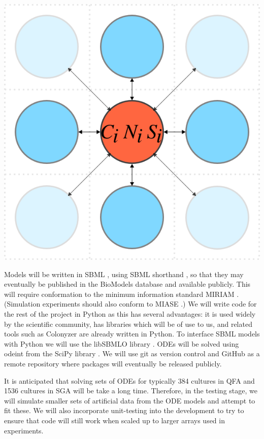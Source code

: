 \begin{Figure}
  \centering
  \includegraphics[width=\linewidth]{square_array}
  \label{fig:simple_model}
\end{Figure}

Models will be written in SBML \citep{Hucka2003}, using SBML shorthand
\citep{Wilkinson2011}, so that they may eventually be published in the
BioModels database \citep{BioModels2015b} and available publicly. This
will require conformation to the minimum information standard MIRIAM
\citep{MIRIAM2005}. (Simulation experiments should also conform to
MIASE \cite{MIASE2011}.) We will write code for the rest of the
project in Python as this has several advantages: it is used widely by
the scientific community, has libraries which will be of use to us,
and related tools such as Colonyzer \citep{Lawless2010} are already
written in Python. To interface SBML models with Python we will use
the libSBMLO library \citep{Bornstein2008}. ODEs will be solved using
odeint from the SciPy library \citep{SciPy}. We will use git as
version control and GitHub as a remote repository where packages will
eventually be released publicly.

It is anticipated that solving sets of ODEs for typically 384 cultures
in QFA and 1536 cultures in SGA will be take a long time. Therefore,
in the testing stage, we will simulate smaller sets of artificial data
from the ODE models and attempt to fit these. We will also incorporate
unit-testing into the development to try to ensure that code will
still work when scaled up to larger arrays used in experiments.

